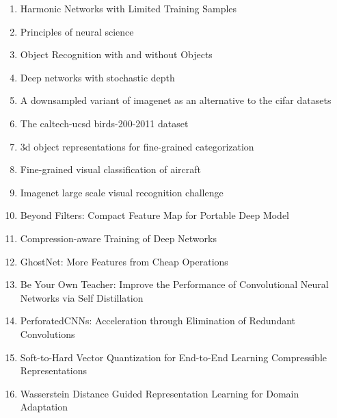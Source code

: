 \documentclass[acmlarge]{acmart}
\begin{document}
\begin{enumerate}
	\item Harmonic Networks with Limited Training Samples \cite{ulicny2019harmonic} 

	\item Principles of neural science \cite{kandel2000principles} 

	\item Object Recognition with and without Objects \cite{zhu2016object} 

	\item Deep networks with stochastic depth \cite{huang2016deep} 

	\item A downsampled variant of imagenet as an alternative to the cifar datasets \cite{chrabaszcz2017downsampled} 

	\item The caltech-ucsd birds-200-2011 dataset \cite{wah2011caltech} 

	\item 3d object representations for fine-grained categorization \cite{krause20133d} 

	\item Fine-grained visual classification of aircraft \cite{maji2013fine} 

	\item Imagenet large scale visual recognition challenge \cite{russakovsky2015imagenet} 

	\item Beyond Filters: Compact Feature Map for Portable Deep Model \cite{pmlr-v70-wang17m} 

	\item Compression-aware Training of Deep Networks \cite{alvarez2017compressionaware} 

	\item GhostNet: More Features from Cheap Operations \cite{han2019ghostnet} 

	\item Be Your Own Teacher: Improve the Performance of Convolutional Neural Networks via Self Distillation \cite{zhang2019teacher} 

	\item PerforatedCNNs: Acceleration through Elimination of Redundant Convolutions \cite{figurnov2015perforatedcnns} 

	\item Soft-to-Hard Vector Quantization for End-to-End Learning Compressible Representations \cite{agustsson2017softtohard} 

	\item Wasserstein Distance Guided Representation Learning for Domain Adaptation \cite{shen2017wasserstein} 


\end{enumerate}
\end{document}
